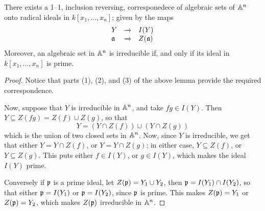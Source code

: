 \begin{corollary}
    There exists a 1--1, inclusion reversing, corresponedece of algebraic sets
    of $\mathbb{A}^n$ onto radical ideals in $k[x_1, \dots, x_n]$; given by the maps
    \begin{equation*}
        \begin{array}{lcl}
            Y   &   \xrightarrow{}  &   I(Y)    \\
            \mathfrak{a}   &   \xrightarrow{}  &   Z(\mathfrak{a})    \\
        \end{array}
    \end{equation*}
    Moreover, an algebraic set in $\mathbb{A}^n$ is irreducible if, and only if its
    ideal in $k[x_1, \dots, x_n]$ is prime.
\end{corollary}
\begin{proof}
    Notice that parts (1), (2), and (3) of the above lemma provide the required
    correspondence.

    Now, suppose that $Y$ is irreducible in  $\mathbb{A}^n$, and take  $fg \in I(Y)$.
    Then $Y \subseteq Z(fg)=Z(f) \cup Z(g)$, so that
    \begin{equation*}
        Y=(Y \cap Z(f)) \cup (Y \cap Z(g))
    \end{equation*}
    which is the union of two closed sets in $\mathbb{A}^n$. Now, since $Y$ is
    irreducible, we get that either  $Y=Y \cap Z(f)$, or $Y=Y \cap Z(g)$; in
    either case, $Y \subseteq Z(f)$, or $Y \subseteq Z(g)$. This puts either $f
    \in I(Y)$, or $g \in I(Y)$, which makes the ideal $I(Y)$ prime.

    Conversely if $\mathfrak{p}$ is a prime ideal, let  $Z(\mathfrak{p})=Y_1 \cup Y_2$, then
    $\mathfrak{p}=I(Y_1) \cap I(Y_2)$, so that either $\mathfrak{p}=I(Y_1)$ or $\mathfrak{p}=I(Y_2)$,
    since $\mathfrak{p}$ is prime. This makes  $Z(\mathfrak{p})=Y_1$ or $Z(\mathfrak{p})=Y_2$,  which makes
    $Z(\mathfrak{p})$ irreducible in $\mathbb{A}^n$.
\end{proof}

